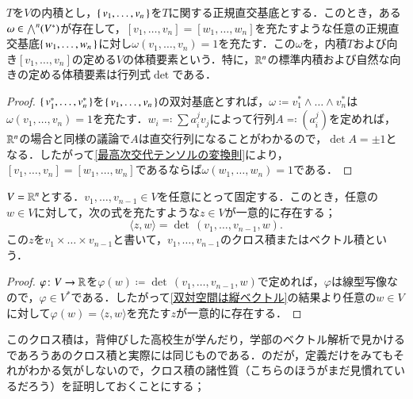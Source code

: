 \begin{thm}
$T$を$V$の内積とし，$\set{v_1, \dots, v_n}$を$T$に関する正規直交基底とする．このとき，ある$\omega \in \bigwedge^n(V^*)$が存在して，$[v_1, \dots, v_n] = [w_1, \dots, w_n]$を充たすような任意の正規直交基底$\set{w_1, \dots, w_n}$に対し$\omega (v_1, \dots, v_n) = 1$を充たす．この$\omega$を，内積$T$および向き$[v_1, \dots, v_n]$の定める$V$の体積要素という．特に，$\mathbb{R}^n$の標準内積および自然な向きの定める体積要素は行列式$\det$である．
\end{thm}

\begin{proof}
$\set{v_1^*, \dots, v_n^*}$を$\set{v_1, \dots ,v_n}$の双対基底とすれば，$\omega \coloneqq v_1^* \wedge \dots \wedge v_n^*$は$\omega(v_1, \dots ,v_n) = 1$を充たす．$w_i \eqqcolon \sum a_i^j v_j$によって行列$A \eqqcolon \left(a_i^j\right)$を定めれば，$\mathbb{R}^n$の場合と同様の議論で$A$は直交行列になることがわかるので，$\det A = \pm 1$となる．したがって\cref{最高次交代テンソルの変換則}により，$[v_1, \dots, v_n] = [w_1, \dots, w_n]$であるならば$\omega(w_1, \dots, w_n) = 1$である．
\end{proof}

\begin{prop}
$V = \mathbb{R}^n$とする．$v_1, \dots, v_{n-1} \in V$を任意にとって固定する．このとき，任意の$w \in V$に対して，次の式を充たすような$z \in V$が一意的に存在する；
\begin{equation}
\langle z,w \rangle = \det\, (v_1, \dots, v_{n-1}, w).
\end{equation}この$z$を$v_1 \times \dots \times v_{n-1}$と書いて，$v_1, \dots, v_{n-1}$のクロス積またはベクトル積という．
\end{prop}

\begin{proof}
$\varphi \colon V \to \mathbb{R}$を$\varphi(w) \coloneqq \det\, (v_1, \dots, v_{n-1}, w)$で定めれば，$\varphi$は線型写像なので，$\varphi \in V^*$である．したがって\cref{双対空間は縦ベクトル}の結果より任意の$w \in V$に対して$\varphi(w) = \langle z,w \rangle$を充たす$z$が一意的に存在する．
\end{proof}

このクロス積は，背伸びした高校生が学んだり，学部のベクトル解析で見かけるであろうあのクロス積と実際には同じものである．のだが，定義だけをみてもそれがわかる気がしないので，クロス積の諸性質（こちらのほうがまだ見慣れているだろう）を証明しておくことにする；

